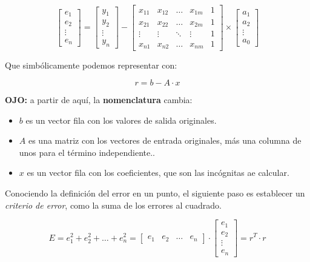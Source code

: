 \documentclass[11pt]{scrartcl}
\begin{document}
$$
\begin{bmatrix}
e_1 \\
e_2 \\
\vdots \\
e_n
\end{bmatrix}
=
\begin{bmatrix}
y_1 \\
y_2 \\
\vdots \\
y_n  
\end{bmatrix}
-
\begin{bmatrix}
x_{11} & x_{12} & \dots & x_{1m} & 1 \\
x_{21} & x_{22} & \dots & x_{2m} & 1 \\
\vdots & \vdots & \ddots & \vdots & 1 \\
x_{n1} & x_{n2} & \dots & x_{nm} & 1
\end{bmatrix}
\times
\begin{bmatrix}
a_1 \\
a_2 \\
\vdots \\
a_0  
\end{bmatrix}
$$

Que simbólicamente podemos representar con:

$$
r = b - A \cdot x
$$

\begin{framed}
  \textbf{OJO:} a partir de aquí, la \textbf{nomenclatura} cambia:
  \begin{itemize}
  \item $b$ es un vector fila con los valores de salida originales.
  \item $A$ es una matriz con los vectores de entrada originales, más una
    columna de unos para el término independiente..
  \item $x$ es un vector fila con los coeficientes, que son las incógnitas ae
    calcular.
  \end{itemize}
\end{framed}

Conociendo la definición del error en un punto, el siguiente paso es establecer
un \textit{criterio de error}, como la suma de los errores al cuadrado.

$$
E = e_1^2 + e_2^2 + \dots + e_n^2 = \begin{bmatrix}e_1 & e_2 & \dots & e_n \end{bmatrix} \cdot
\begin{bmatrix}
e_1 \\
e_2 \\
\vdots \\
e_n
\end{bmatrix}
=
r^T \cdot r 
$$
\end{document}
